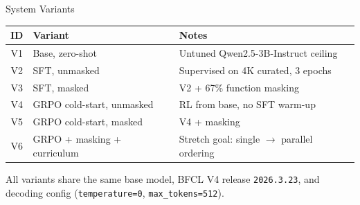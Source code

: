 \documentclass[aspectratio=169,11pt]{beamer}
\begin{document}
\begin{frame}{System Variants}
  \begin{table}
    \centering
    \small
    \begin{tabular}{cll}
      \toprule
      \textbf{ID} & \textbf{Variant} & \textbf{Notes} \\
      \midrule
      V1 & Base, zero-shot                  & Untuned Qwen2.5-3B-Instruct ceiling \\
      V2 & SFT, unmasked                    & Supervised on 4K curated, 3 epochs \\
      V3 & SFT, masked                      & V2 + 67\% function masking \\
      V4 & GRPO cold-start, unmasked        & RL from base, no SFT warm-up \\
      V5 & GRPO cold-start, masked          & V4 + masking \\
      V6 & GRPO + masking + curriculum      & Stretch goal: single $\rightarrow$ parallel ordering \\
      \bottomrule
    \end{tabular}
  \end{table}
  \vspace{4pt}
  {\small\color{dimgray} All variants share the same base model, BFCL V4 release \texttt{2026.3.23}, and decoding config (\texttt{temperature=0}, \texttt{max\_tokens=512}).}
\end{frame}
\end{document}
